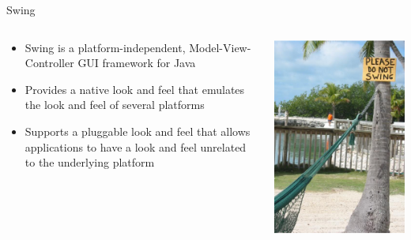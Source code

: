 \begin{frame}{Swing}
  \begin{columns}[c]
    \begin{column}{0.55\textwidth}
      \begin{itemize}
      \item Swing is a platform-independent, Model-View-Controller GUI
        framework for Java
      \item Provides a native look and feel that emulates the look and
        feel of several platforms
      \item Supports a pluggable look and feel that allows applications to
        have a look and feel unrelated to the underlying platform
      \end{itemize}
    \end{column}
    \begin{column}{0.45\textwidth}
      \begin{center}
        \includegraphics[width=\textwidth]{figures/do-not-swing}
      \end{center}
    \end{column}
  \end{columns}
\end{frame}

